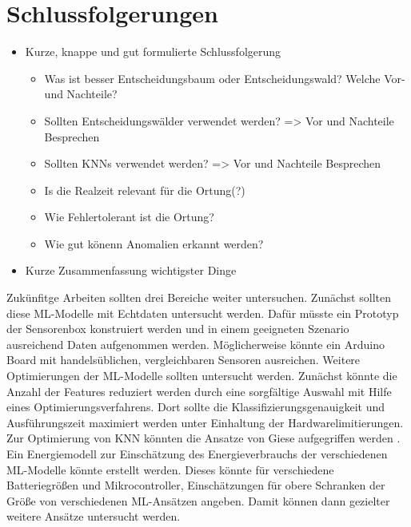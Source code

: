 \chapter{Schlussfolgerungen}
\begin{itemize}
    \item Kurze, knappe und gut formulierte Schlussfolgerung
    \begin{itemize}
        \item Was ist besser Entscheidungsbaum oder Entscheidungswald? Welche Vor- und Nachteile?
        \item Sollten Entscheidungswälder verwendet werden? => Vor und Nachteile Besprechen
        \item Sollten KNNs verwendet werden? => Vor und Nachteile Besprechen
        \item Is die Realzeit relevant für die Ortung(?)
        \item Wie Fehlertolerant ist die Ortung?
        \item Wie gut könenn Anomalien erkannt werden?
    \end{itemize}
    \item Kurze Zusammenfassung wichtigster Dinge
\end{itemize}
Zukünfitge Arbeiten sollten drei Bereiche weiter untersuchen.
Zunächst sollten diese ML-Modelle mit Echtdaten untersucht werden.
Dafür müsste ein Prototyp der Sensorenbox konstruiert werden und in
einem geeigneten Szenario ausreichend Daten aufgenommen werden.
Möglicherweise könnte ein Arduino Board mit handelsüblichen, vergleichbaren Sensoren ausreichen.
\newline
\newline
Weitere Optimierungen der ML-Modelle sollten untersucht werden.
Zunächst könnte die Anzahl der Features reduziert werden durch eine sorgfältige Auswahl mit Hilfe eines Optimierungsverfahrens.
Dort sollte die Klassifizierungsgenauigkeit und Ausführungszeit maximiert werden unter Einhaltung der Hardwarelimitierungen.
Zur Optimierung von KNN könnten die Ansatze von Giese aufgegriffen werden \cite{gieseThesis}.
\newline
\newline
Ein Energiemodell zur Einschätzung des Energieverbrauchs der verschiedenen ML-Modelle könnte erstellt werden.
Dieses könnte für verschiedene Batteriegrößen und Mikrocontroller, Einschätzungen für obere Schranken der Größe von
verschiedenen ML-Ansätzen angeben.
Damit können dann gezielter weitere Ansätze untersucht werden.